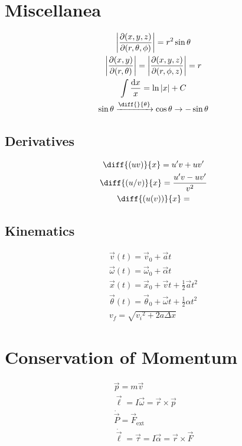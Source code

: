 \documentclass{cheatsheet}
\begin{document}
	\section{Miscellanea}	
		\begin{gather*}
			\left|\frac{\partial(x,y,z)}{\partial(r,\theta,\phi)}\right| = r^2 \sin \theta \\
			\left| \frac{\partial(x,y)}{\partial(r,\theta)} \right| = \left| \frac{\partial(x,y,z)}{\partial(r,\phi,z)} \right| = r\\
			\int \frac{\mathrm{d}x}{x} = \ln|x| + C\\
			\sin\theta \xrightarrow{\diff{}{\theta}} \cos\theta \rightarrow -\sin\theta\\
		\end{gather*}
	\subsection{Derivatives}
		\begin{gather*}
			\diff{(uv)}{x} = u'v + uv'	\\
			\diff{(u/v)}{x} = \frac{u'v - uv'}{v^2}	\\
			\diff{\left( u(v) \right)}{x} = 
		\end{gather*}
	\subsection{Kinematics}
		\begin{gather*}
			\vec v(t) = \vec v_0 + \vec at 	\tag{velocity}\\
			\vec \omega(t) = \vec\omega_0 + \vec\alpha t	\tag{rot. form}\\
			\vec x(t) = \vec x_0 + \vec vt + \frac{1}{2}\vec a t^2	\tag{displacement}\\
			\vec\theta(t) = \vec\theta_0 + \vec\omega t + \frac{1}{2}\alpha t^2	\tag{rot. form}\\
			v_f = \sqrt{{v_i}^2 + 2a\Delta x}	\tag{$v_f$}
		\end{gather*}

	\section{Conservation of Momentum}
	\begin{gather}
		\vec p = m\vec v	\tag{momentum}\\
		\vec\ell = I\vec\omega = \vec r \times \vec p	\tag{rot. form}\\
		\dot{\vec P} = \vec F_\mathrm{ext} \tag{3rd law}\\
		\dot{\vec\ell} = \vec\tau = I\vec\alpha= \vec r \times \vec F	\tag{rot. form}
	\end{gather}
\end{document}
